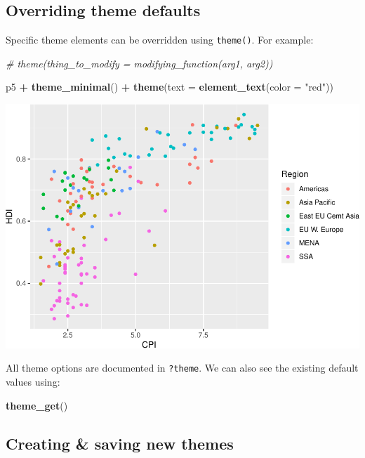 \documentclass[
]{book}
\newenvironment{Shaded}{\begin{snugshade}}{\end{snugshade}}
\newcommand{\CommentTok}[1]{\textcolor[rgb]{0.56,0.35,0.01}{\textit{#1}}}
\newcommand{\DataTypeTok}[1]{\textcolor[rgb]{0.13,0.29,0.53}{#1}}
\newcommand{\KeywordTok}[1]{\textcolor[rgb]{0.13,0.29,0.53}{\textbf{#1}}}
\newcommand{\NormalTok}[1]{#1}
\newcommand{\OperatorTok}[1]{\textcolor[rgb]{0.81,0.36,0.00}{\textbf{#1}}}
\newcommand{\StringTok}[1]{\textcolor[rgb]{0.31,0.60,0.02}{#1}}
\begin{document}
\hypertarget{overriding-theme-defaults}{%
\subsection{Overriding theme defaults}\label{overriding-theme-defaults}}

Specific theme elements can be overridden using \texttt{theme()}. For example:

\begin{Shaded}
\begin{Highlighting}[]
\CommentTok{\# theme(thing\_to\_modify = modifying\_function(arg1, arg2))}

\NormalTok{p5 }\OperatorTok{+}\StringTok{ }\KeywordTok{theme\_minimal}\NormalTok{() }\OperatorTok{+}
\StringTok{  }\KeywordTok{theme}\NormalTok{(}\DataTypeTok{text =} \KeywordTok{element\_text}\NormalTok{(}\DataTypeTok{color =} \StringTok{"red"}\NormalTok{))  }
\end{Highlighting}
\end{Shaded}

\includegraphics{R/Rgraphics/figures/unnamed-chunk-196-1.pdf}

All theme options are documented in \texttt{?theme}. We can also see the
existing default values using:

\begin{Shaded}
\begin{Highlighting}[]
\KeywordTok{theme\_get}\NormalTok{()}
\end{Highlighting}
\end{Shaded}

\hypertarget{creating-saving-new-themes}{%
\subsection{Creating \& saving new themes}\label{creating-saving-new-themes}}
\end{document}
